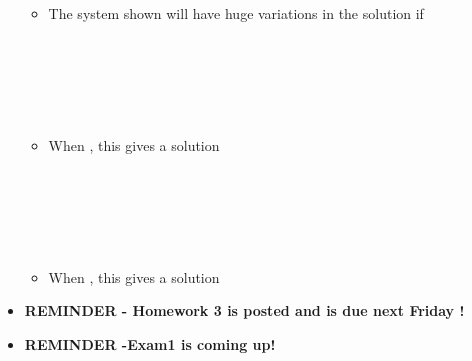 \documentclass[11pt]{article}
\begin{document}
\begin{itemize}
\begin{itemize}
		 \\\\
		\\\\
	
	\item The system shown will have huge variations in the solution if \\\\
	
		 \\\\
		\\\\
	\item When , this gives a solution 	\\\\
	
	 \\\\
		\\\\
	\item When , this gives a solution 	

\end{itemize}
\newpage 

	 \item \textbf{ \LARGE REMINDER - Homework 3 is posted and is due next Friday !} \\
 \item \textbf{ \LARGE REMINDER -Exam1 is coming up!} \\
\end{itemize}


	
\end{document}
